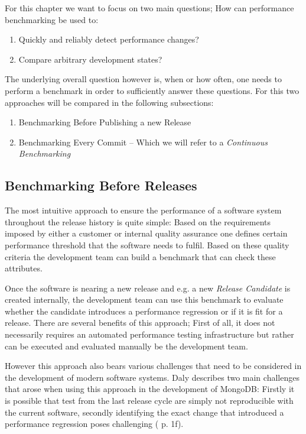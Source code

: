 \documentclass[	runningheads,
				a4paper]{llncs}
\begin{document}
	For this chapter we want to focus on two main questions; How can performance benchmarking be used to:
	\begin{enumerate}
		\item Quickly and reliably detect performance changes?
		\item Compare arbitrary development states?
	\end{enumerate}

	The underlying overall question however is, when or how often, one needs to perform a benchmark in order to sufficiently answer these questions. For this two approaches will be compared in the following subsections:
	\begin{enumerate}
		\item Benchmarking Before Publishing a new Release
		\item Benchmarking Every Commit -- Which we will refer to a \textit{Continuous Benchmarking}
	\end{enumerate}

	\subsection{Benchmarking Before Releases}
	\label{ssec:bench_rel}
	The most intuitive approach to ensure the performance of a software system throughout the release history is quite simple: Based on the requirements imposed by either a customer or internal quality assurance one defines certain performance threshold that the software needs to fulfil. Based on these quality criteria the development team can build a benchmark that can check these attributes.

	Once the software is nearing a new release and e.g. a new \textit{Release Candidate} is created internally, the development team can use this benchmark to evaluate whether the candidate introduces a performance regression or if it is fit for a release. There are several benefits of this approach; First of all, it does not necessarily requires an automated performance testing infrastructure but rather can be executed and evaluated manually be the development team. 

	However this approach also bears various challenges that need to be considered in the development of modern software systems. Daly describes two main challenges that arose when using this approach in the development of MongoDB: Firstly it is possible that test from the last release cycle are simply not reproducible with the current software, secondly identifying the exact change that introduced a performance regression poses challenging (\cite{daly2021} p. 1f).
\end{document}
